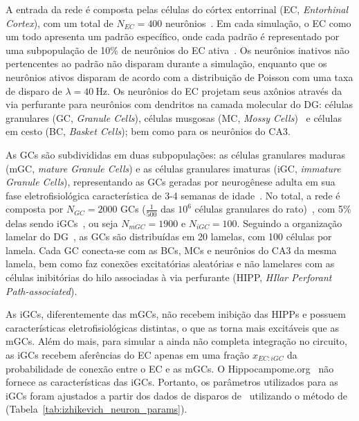 A entrada da rede é composta pelas células do córtex entorrinal (EC, \textit{Entorhinal Cortex}), com um total de $N_{EC} = 400$
neurônios~\cite{amaralChapter1990,kimAdult2024}. Em cada simulação, o EC como um todo apresenta um padrão específico, onde cada
padrão é representado por uma subpopulação de 10\% de neurônios do EC ativa~\cite{mcnaughtonDead1991}. Os neurônios inativos não
pertencentes ao padrão não disparam durante a simulação, enquanto que os neurônios ativos disparam de acordo com a distribuição de
Poisson com uma taxa de disparo de $\lambda = \SI{40}{\hertz}$. Os neurônios do EC projetam seus axônios através da via perfurante
para neurônios com dendritos na camada molecular do DG: células granulares (GC, \textit{Granule Cells}), células musgosas (MC,
\textit{Mossy Cells})~\cite{scharfmanHilar2013} e células em cesto (BC, \textit{Basket Cells}); bem como para os neurônios do CA3.

As GCs são subdivididas em duas subpopulações: as células granulares maduras (mGC, \textit{mature Granule Cells}) e as células
granulares imaturas (iGC, \textit{immature Granule Cells}), representando as GCs geradas por neurogênese adulta em sua fase
eletrofisiológica característica de 3-4 semanas de idade~\cite{aimoneRegulation2014}. No total, a rede é composta por $N_{GC} =
2000$ GCs ($\frac{1}{500}$ das $10^6$ células granulares do rato)~\cite{westUnbiased1991}, com 5\% delas sendo
iGCs~\cite{cameronAdult2001}, ou seja $N_{mGC} = 1900$ e $N_{iGC} = 100$. Seguindo a organização lamelar do
DG~\cite{sloviterUpdating2012}, as GCs são distribuídas em 20 lamelas, com 100 células por lamela. Cada GC conecta-se com as BCs,
MCs e neurônios do CA3 da mesma lamela, bem como faz conexões excitatórias aleatórias e não lamelares com as células inibitórias
do hilo associadas à via perfurante (HIPP, \textit{HIlar Perforant Path-associated}).

As iGCs, diferentemente das mGCs, não recebem inibição das HIPPs e possuem características eletrofisiológicas distintas, o que as
torna mais excitáveis que as mGCs. Além do mais, para simular a ainda não completa integração no circuito, as iGCs recebem
aferências do EC apenas em uma fração $x_{EC:iGC}$ da probabilidade de conexão entre o EC e as mGCs. O
Hippocampome.org~\cite{wheelerHippocampomeorg2023} não fornece as características das iGCs. Portanto, os parâmetros utilizados
para as iGCs foram ajustados a partir dos dados de disparos de~ utilizando o método
de~ (Tabela~\ref{tab:izhikevich_neuron_params}).

